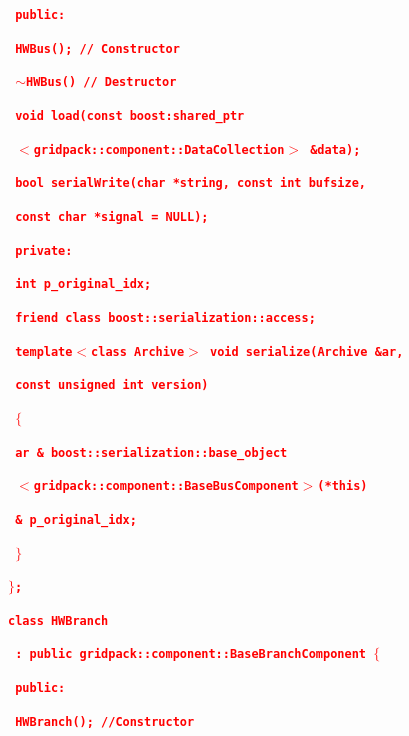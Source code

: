 \documentclass[12pt]{report} %
\begin{document}
\textcolor{red}{\texttt{\textbf{  public:}}}

\textcolor{red}{\texttt{\textbf{    HWBus();  // Constructor}}}

\textcolor{red}{\texttt{\textbf{    $\boldsymbol{\mathrm{\sim}}$HWBus()  // Destructor}}}

\textcolor{red}{\texttt{\textbf{    void load(const boost:shared\_ptr}}}

\textcolor{red}{\texttt{\textbf{              $\boldsymbol{\mathrm{<}}$gridpack::component::DataCollection$\boldsymbol{\mathrm{>}}$ \&data);}}}

\textcolor{red}{\texttt{\textbf{    bool serialWrite(char *string, const int bufsize,}}}

\textcolor{red}{\texttt{\textbf{                     const char *signal = NULL);}}}

\textcolor{red}{\texttt{\textbf{  private:}}}

\textcolor{red}{\texttt{\textbf{    int p\_original\_idx;}}}

\textcolor{red}{\texttt{\textbf{    friend class boost::serialization::access;}}}

\textcolor{red}{\texttt{\textbf{    template$\boldsymbol{\mathrm{<}}$class Archive$\boldsymbol{\mathrm{>}}$ void serialize(Archive \&ar,}}}

\textcolor{red}{\texttt{\textbf{      const unsigned int version)}}}

\textcolor{red}{\texttt{\textbf{    $\boldsymbol{\mathrm{\{}}$}}}

\textcolor{red}{\texttt{\textbf{      ar \& boost::serialization::base\_object}}}

\textcolor{red}{\texttt{\textbf{         $\boldsymbol{\mathrm{<}}$gridpack::component::BaseBusComponent$\boldsymbol{\mathrm{>}}$(*this)}}}

\textcolor{red}{\texttt{\textbf{         \& p\_original\_idx;}}}

\textcolor{red}{\texttt{\textbf{    $\boldsymbol{\mathrm{\}}}$}}}

\textcolor{red}{\texttt{\textbf{$\boldsymbol{\mathrm{\}}}$;}}}

\textcolor{red}{\texttt{\textbf{class HWBranch}}}

\textcolor{red}{\texttt{\textbf{  : public gridpack::component::BaseBranchComponent $\boldsymbol{\mathrm{\{}}$}}}

\textcolor{red}{\texttt{\textbf{  public:}}}

\textcolor{red}{\texttt{\textbf{    HWBranch();   //Constructor}}}
\end{document}
